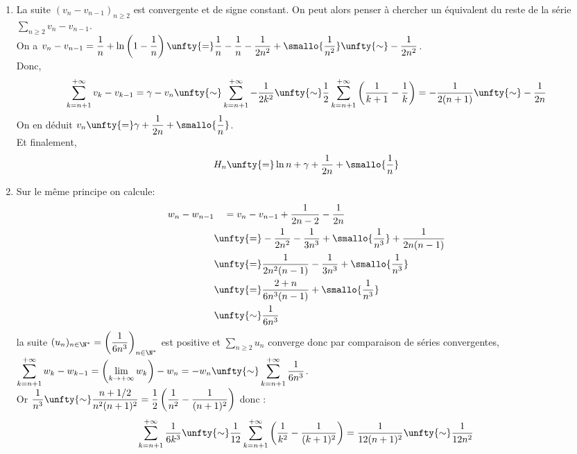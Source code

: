 \documentclass{book}
\begin{document}
\begin{enumerate}[leftmargin=*]
		On peut donc écrire $H_n\unfty{=}\gamma+\ln n+\smallo{\ln n}$ où $\gamma$ est appelée constante d'Euler.
		\item La suite $(v_n-v_{n-1})_{n\geq 2}$ est convergente et de signe constant. On peut alors penser à chercher un équivalent du reste de la série $\displaystyle\sum\limits_{n\geq 2} v_n-v_{n-1}$.\\
		On a $v_n-v_{n-1}=\displaystyle\frac{1}{n}+\ln\left(1-\displaystyle\frac{1}{n}\right)\unfty{=}\displaystyle\frac{1}{n}-\displaystyle\frac{1}{n}-\displaystyle\frac{1}{2n^2}+\smallo{\displaystyle\frac{1}{n^2}}\unfty{\sim} -\displaystyle\frac{1}{2n^2}$.\\
		Donc, \[\displaystyle\sum\limits_{k=n+1}^{+\infty}{v_k-v_{k-1}}=\gamma-v_n\unfty{\sim}\displaystyle\sum\limits_{k=n+1}^{+\infty}-{\frac{1}{2k^2}}\unfty{\sim}\displaystyle\frac{1}{2}\displaystyle\sum\limits_{k=n+1}^{+\infty}{\left(\frac{1}{k+1}-\frac{1}{k}\right)}=-\displaystyle\frac{1}{2(n+1)}\unfty{\sim}-\displaystyle\frac{1}{2n}\]
		On en déduit $v_n\unfty{=}\gamma +\displaystyle\frac{1}{2n}+\smallo{\displaystyle\frac{1}{n}}$.\\
		Et finalement,$$H_n\unfty{=}\ln n+\gamma +\displaystyle\frac{1}{2n}+\smallo{\displaystyle\frac{1}{n}}$$
		\item Sur le même principe on calcule:
		\begin{align*}
			w_n-w_{n-1}&\ \ \ =v_n-v_{n-1}+\frac{1}{2n-2}-\frac{1}{2n}\\
			&\unfty{=}-\frac{1}{2n^2}-\frac{1}{3n^3}+\smallo{\frac{1}{n^3}}+\frac{1}{2n(n-1)}\\
			&\unfty{=}\frac{1}{2n^2(n-1)}-\frac{1}{3n^3}+\smallo{\frac{1}{n^3}}\\
			&\unfty{=}\frac{2+n}{6n^3(n-1)}+\smallo{\frac{1}{n^3}}\\
			&\unfty{\sim}\frac{1}{6n^3}
		\end{align*}
		la suite $(u_n)_{n\in \N^*}=\displaystyle\left(\frac{1}{6n^3}\right)_{n\in \N^*}$ est positive et $\displaystyle\sum\limits_{n\geq 2} u_n$ converge donc par comparaison de séries convergentes,\\
		$\displaystyle\sum\limits_{k=n+1}^{+\infty} w_k-w_{k-1}=\left(\lim\limits_{k\to +\infty} w_k\right)-w_n=-w_n\unfty{\sim}\displaystyle\sum\limits_{k=n+1}^{+\infty} \frac{1}{6n^3}$.\\
		Or $\displaystyle\frac{1}{n^3}\unfty{\sim} \displaystyle\frac{n+1/2}{n^2(n+1)^2}=\displaystyle\frac{1}{2}\left(\displaystyle\frac{1}{n^2}-\displaystyle\frac{1}{(n+1)^2}\right)$ donc : \[\displaystyle\sum\limits_{k=n+1}^{+\infty} \frac{1}{6k^3}\unfty{\sim} \displaystyle\frac{1}{12}\displaystyle\sum\limits_{k=n+1}^{+\infty}\left(\frac{1}{k^2}-\frac{1}{(k+1)^2}\right)=\displaystyle\frac{1}{12(n+1)^2}\unfty{\sim}\displaystyle\frac{1}{12n^2}\]

\end{enumerate}
\end{document}
